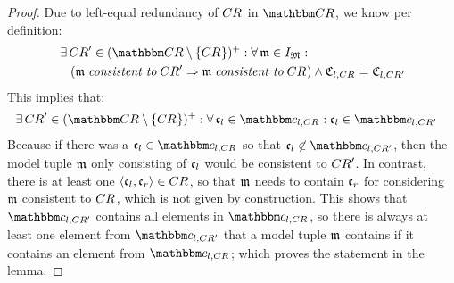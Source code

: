 \begin{proof}
    Due to left-equal redundancy of $\consistencyrelation{CR}{}$ in $\consistencyrelationset{CR}$, we know per definition:
    \begin{align*}
        &
        \exists \consistencyrelation{CR}{}' \in \transitiveclosure{(\consistencyrelationset{CR} \setminus \setted{\consistencyrelation{CR}{}})} :
        \forall \modeltuple{m} \in \metamodeltupleinstanceset{M} : \\
        & \formulaskip
        (\modeltuple{m} \consistenttomath \consistencyrelation{CR}{}' \Rightarrow \modeltuple{m} \consistenttomath \consistencyrelation{CR}{})
        \land 
        \classtuple{C}{l,\consistencyrelation{CR}{}} = \classtuple{C}{l,\consistencyrelation{CR}{}'}
    \end{align*}
    This implies that:
    \begin{align*}
        &
        \exists \consistencyrelation{CR}{}' \in \transitiveclosure{(\consistencyrelationset{CR} \setminus \setted{\consistencyrelation{CR}{}})} :
        \forall \conditionelement{c}{l} \in \condition{c}{l,\consistencyrelation{CR}{}} :
        \conditionelement{c}{l} \in \condition{c}{l,\consistencyrelation{CR}{}'}
    \end{align*}
    Because if there was a $\conditionelement{c}{l} \in \condition{c}{l,\consistencyrelation{CR}{}}$ so that $\conditionelement{c}{l} \not\in \condition{c}{l,\consistencyrelation{CR}{}'}$, then the model tuple $\modeltuple{m}$ only consisting of $\conditionelement{c}{l}$ would be consistent to $\consistencyrelation{CR}{}'$.
    In contrast, there is at least one $\tupled{\conditionelement{c}{l}, \conditionelement{c}{r}} \in \consistencyrelation{CR}{}$, so that $\modeltuple{m}$ needs to contain $\conditionelement{c}{r}$ for considering $\modeltuple{m}$ consistent to $\consistencyrelation{CR}{}$, which is not given by construction.
    This shows that $\condition{c}{l,\consistencyrelation{CR}{}'}$ contains all elements in $\condition{c}{l,\consistencyrelation{CR}{}}$, so there is always at least one element from $\condition{c}{l,\consistencyrelation{CR}{}'}$ that a model tuple $\modeltuple{m}$ contains if it contains an element from $\condition{c}{l,\consistencyrelation{CR}{}}$; which proves the statement in the lemma.
\end{proof}

